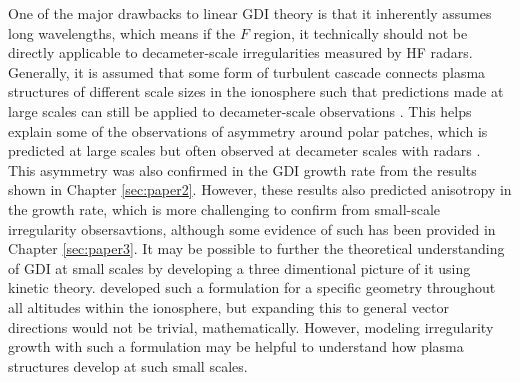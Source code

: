 One of the major drawbacks to linear GDI theory is that it inherently assumes long wavelengths, which means if the \(F\) region, it technically should not be directly applicable to decameter-scale irregularities measured by HF radars.  Generally, it is assumed that some form of turbulent cascade connects plasma structures of different scale sizes in the ionosphere such that predictions made at large scales can still be applied to decameter-scale observations \citep{Tsunoda1988}.  This helps explain some of the observations of asymmetry around polar patches, which is predicted at large scales but often observed at decameter scales with radars \citep[e.g.][]{Weber1984,Milan2002b,Koustov2012}.  This asymmetry was also confirmed in the GDI growth rate from the results shown in Chapter \ref{sec:paper2}.  However, these results also predicted anisotropy in the growth rate, which is more challenging to confirm from small-scale irregularity obsersavtions, although some evidence of such has been provided in Chapter \ref{sec:paper3}.  It may be possible to further the theoretical understanding of GDI at small scales by developing a three dimentional picture of it using kinetic theory.  \citet{Basu1995} developed such a formulation for a specific geometry throughout all altitudes within the ionosphere, but expanding this to general vector directions would not be trivial, mathematically.  However, modeling irregularity growth with such a formulation may be helpful to understand how plasma structures develop at such small scales.

